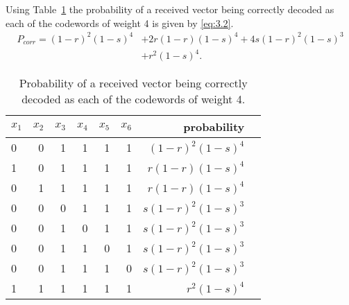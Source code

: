 Using Table~\ref{tab:14} the probability of a received vector being correctly decoded as each of the codewords of weight 4 is given by \eqref{eq:3.2}.
\begin{align}
\label{eq:3.2}
	P_{corr} = (1-r)^2(1-s)^4 &+ 2r(1-r)(1-s)^4 + 4s(1-r)^2(1-s)^3\nonumber\\ &+ r^2(1-s)^4.
\end{align}
\begin{table}[!h]\centering
\begin{tabular}{lrrrrr|rr}\toprule
$x_1$ &$x_2$ &$x_3$ &$x_4$ &$x_5$ &$x_6$ &probability \\\midrule
0 &0 &1 &1 &1 &1 &$(1-r)^2(1-s)^4$ \\
1 &0 &1 &1 &1 &1 &$r(1-r)(1-s)^4$ \\
0 &1 &1 &1 &1 &1 &$r(1-r)(1-s)^4$ \\
0 &0 &0 &1 &1 &1 &$s(1-r)^2(1-s)^3$ \\
0 &0 &1 &0 &1 &1 &$s(1-r)^2(1-s)^3$ \\
0 &0 &1 &1 &0 &1 &$s(1-r)^2(1-s)^3$ \\
0 &0 &1 &1 &1 &0 &$s(1-r)^2(1-s)^3$ \\
1 &1 &1 &1 &1 &1 &$r^2(1-s)^4$ \\
\bottomrule
\end{tabular}
\caption{Probability of a received vector being correctly decoded as each of the codewords of weight 4.}\label{tab:14}
\end{table}
